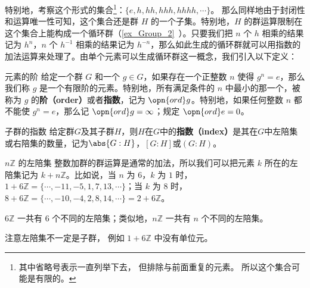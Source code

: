 特别地，考察这个形式的集合\footnote{其中省略号表示一直列举下去， 但排除与前面重复的元素。 所以这个集合可能是有限的。}：$\{e, h, hh, hhh, hhhh, \cdots\}$。 那么同样地由于封闭性和运算唯一性可知，这个集合还是群 $H$ 的一个子集。特别地，$H$ 的群运算限制在这个集合上能构成一个循环群（\autoref{ex_Group_2}~）。只要我们把 $n$ 个 $h$ 相乘的结果记为 $h^n$，$n$ 个 $h^{-1}$ 相乘的结果记为 $h^{-n}$，那么如此生成的循环群就可以用指数的加法运算来处理了。由单个元素可以生成循环群这一概念，我们引入以下定义：

\begin{definition}{元素的阶}\label{def_coset_1}
给定一个群 $G$ 和一个 $g\in G$，如果存在一个正整数 $n$ 使得 $g^n=e$，那么我们称 $g$ 是一个有限阶的元素。特别地，所有满足条件的 $n$ 中最小的那一个，被称为 $g$ 的\textbf{阶（order）}或者\textbf{指数}，记为 $\opn{ord}g$。特别地，如果任何整数 $n$ 都不能使 $g^n=e$，那么记 $\opn{ord}g=\infty$；规定 $\opn{ord}e=0$。
\end{definition}

\begin{definition}{子群的指数}\label{def_coset_2}
给定群$G$及其子群$H$，则$H$在$G$中的\textbf{指数（index）}是其在$G$中左陪集或右陪集的数量，记为$\abs{G:H}$，$[G:H]$或$(G:H)$。
\end{definition}

\begin{example}{$n\mathbb{Z}$ 的左陪集}\label{ex_coset_2}
整数加群的群运算是通常的加法，所以我们可以把元素 $k$ 所在的左陪集记为 $k+n\mathbb{Z}$。比如说，当 $n$ 为 $6$，$k$ 为 $1$ 时，$1+6\mathbb{Z}=\{\cdots, -11, -5, 1, 7, 13, \cdots\}$；当 $k$ 为 $8$ 时，$8+6\mathbb{Z}=\{\cdots, -10, -4, 2, 8, 14, \cdots\}=2+6\mathbb{Z}$。

$6\mathbb{Z}$ 一共有 $6$ 个不同的左陪集；类似地，$n\mathbb{Z}$ 一共有 $n$ 个不同的左陪集。
\end{example}
注意左陪集不一定是子群， 例如 $1 + 6\mathbb Z$ 中没有单位元。

